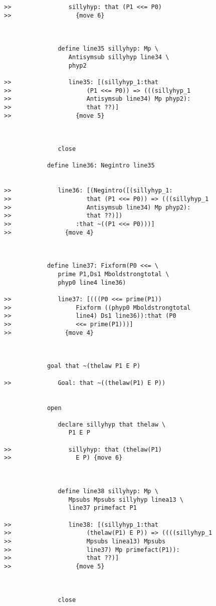 \documentclass[12pt]{article}
\begin{document}
\begin{verbatim}
>>                sillyhyp: that (P1 <<= P0)
>>                  {move 6}



               define line35 sillyhyp: Mp \
                  Antisymsub sillyhyp line34 \
                  phyp2

>>                line35: [(sillyhyp_1:that
>>                     (P1 <<= P0)) => (((sillyhyp_1
>>                     Antisymsub line34) Mp phyp2):
>>                     that ??)]
>>                  {move 5}



               close

            define line36: Negintro line35


>>             line36: [(Negintro([(sillyhyp_1:
>>                     that (P1 <<= P0)) => (((sillyhyp_1
>>                     Antisymsub line34) Mp phyp2):
>>                     that ??)])
>>                  :that ~((P1 <<= P0)))]
>>               {move 4}



            define line37: Fixform(P0 <<= \
               prime P1,Ds1 Mboldstrongtotal \
               phyp0 line4 line36)

>>             line37: [(((P0 <<= prime(P1))
>>                  Fixform ((phyp0 Mboldstrongtotal
>>                  line4) Ds1 line36)):that (P0
>>                  <<= prime(P1)))]
>>               {move 4}



            goal that ~(thelaw P1 E P)

>>             Goal: that ~((thelaw(P1) E P))


            open

               declare sillyhyp that thelaw \
                  P1 E P

>>                sillyhyp: that (thelaw(P1)
>>                  E P) {move 6}



               define line38 sillyhyp: Mp \
                  Mpsubs Mpsubs sillyhyp linea13 \
                  line37 primefact P1

>>                line38: [(sillyhyp_1:that
>>                     (thelaw(P1) E P)) => ((((sillyhyp_1
>>                     Mpsubs linea13) Mpsubs
>>                     line37) Mp primefact(P1)):
>>                     that ??)]
>>                  {move 5}



               close


\end{verbatim}
\end{document}
